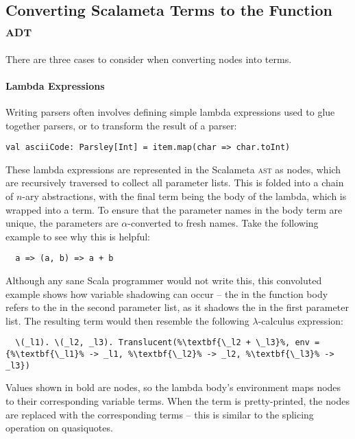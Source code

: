 \documentclass[../../main.tex]{subfiles}
\begin{document}
\subsection{Converting Scalameta Terms to the Function \textsc{adt}}
There are three cases to consider when converting  nodes into  terms.

\paragraph{Lambda Expressions}
Writing parsers often involves defining simple lambda expressions used to glue together parsers, or to transform the result of a parser:
\begin{verbatim}
val asciiCode: Parsley[Int] = item.map(char => char.toInt)
\end{verbatim}

These lambda expressions are represented in the Scalameta \textsc{ast} as  nodes, which are recursively traversed to collect all parameter lists.
This is folded into a chain of $n$-ary abstractions, with the final term being the body of the lambda, which is wrapped into a  term.
To ensure that the parameter names in the  body term are unique, the parameters are $\alpha$-converted to fresh names.
Take the following example to see why this is helpful:
\begin{verbatim}
  a => (a, b) => a + b
\end{verbatim}
Although any sane Scala programmer would not write this, this convoluted example shows how variable shadowing can occur -- the  in the function body refers to the  in the second parameter list, as it shadows the  in the first parameter list.
The resulting  term would then resemble the following $\lambda$-calculus expression:
\begin{lstlisting}
  \(_l1). \(_l2, _l3). Translucent(%\textbf{\_l2 + \_l3}%, env = {%\textbf{\_l1}% -> _l1, %\textbf{\_l2}% -> _l2, %\textbf{\_l3}% -> _l3})
\end{lstlisting}
Values shown in bold are  nodes, so the lambda body's environment maps  nodes to their corresponding variable terms.
When the term is pretty-printed, the  nodes are replaced with the corresponding  terms -- this is similar to the splicing operation on quasiquotes.
\end{document}
